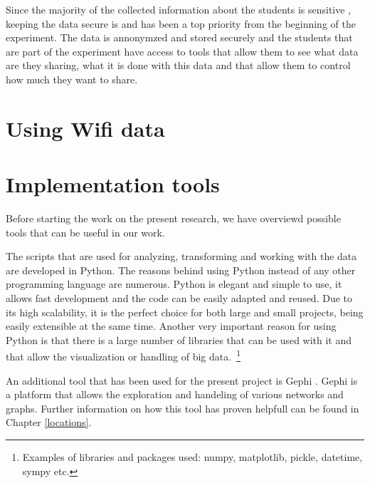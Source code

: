 Since the majority of the collected information about the students is sensitive
\cite{Stopczynski14p}, keeping the data secure is and has been a top priority
from the beginning of the experiment. The data is annonymzed and stored securely
and the students that are part of the experiment have access to tools that allow
them to see what data are they sharing, what it is done with this data and that
allow them to control how much they want to share.

\section{Using Wifi data}

\section{Implementation tools}
Before starting the work on the present research, we have overviewd possible
tools that can be useful in our work.

The scripts that are used for analyzing, transforming and working with the data
are developed in Python. The reasons behind using Python instead of any other
programming language are numerous. Python is elegant and simple to use, it
allows fast development and the code can be easily adapted and reused. Due to
its high scalability, it is the perfect choice for both large and small
projects, being easily extensible at the same time. Another very important
reason for using Python is that there is a large number of libraries that can be
used with it and that allow the visualization or handling of big
data.~\footnote{Examples of libraries and packages used: numpy, matplotlib,
pickle, datetime, sympy etc.}

An additional tool that has been used for the present project is Gephi
\cite{Gephi}. Gephi is a platform that allows the exploration and handeling of
various networks and graphs. Further information on how this tool has proven
helpfull can be found in Chapter \ref{locations}.

